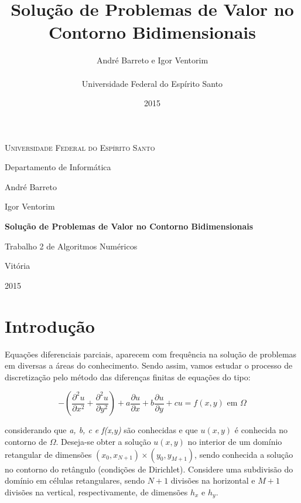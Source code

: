 \documentclass[
	11pt,				%
	oneside,			%
	a4paper,			%
	english,			%
	brazil,				%
	]{article}
\title{\textbf{Solução de Problemas de Valor no Contorno Bidimensionais}}
\author{
André Barreto e Igor Ventorim\\\\
\normalsize Universidade Federal do Espírito Santo\\
}
\date{2015}
\begin{document}

\frenchspacing

\graphicspath{ {Imagens/} }

\begin{titlepage}
	\centering
	{\scshape \large Universidade Federal do Espírito Santo\par}
	{\large Departamento de Informática\par}
	\vspace{1cm}
	{\large André Barreto\par}
	{\large Igor Ventorim\par}
	
	\vfill
	{\LARGE \bfseries Solução de Problemas de Valor no Contorno Bidimensionais\par}
	\vspace{1cm}
	{\large Trabalho 2 de Algoritmos Numéricos\par}

	\vfill

	{\large Vitória\par}
	{\large 2015\par}
\end{titlepage}
\addtocounter{page}{1}

\section{Introdução}
Equações diferenciais parciais, aparecem com frequência na solução de problemas em diversas a áreas do conhecimento. Sendo assim, vamos estudar o processo de discretização pelo método das diferenças finitas de equações do tipo:

\begin{equation} \label{eq:1}
- \left(\frac{\partial^2 u}{\partial x^2} + \frac{\partial^2 u}{\partial y^2}\right) +
a\frac{\partial u}{\partial x} +
b\frac{\partial u}{\partial y} +
cu = f(x,y) \text{ em } \Omega
\end{equation}

\noindent considerando que \textit{a, b, c e f(x,y)} são conhecidas e que $u(x,y)$ é conhecida no contorno de $\Omega$. Deseja-se obter a solução $u(x,y)$ no interior de um domínio retangular de dimensões $(x_0,x_{N+1}) \times (y_0,y_{M+1})$, sendo conhecida a solução no contorno do retângulo (condições de Dirichlet). Considere uma subdivisão do domínio em células retangulares, sendo $N+1$ divisões na horizontal e $M+1$ divisões na vertical, respectivamente, de dimensões $h_x$ e $h_y$.
\end{document}
